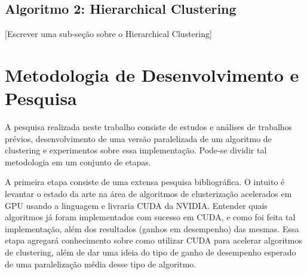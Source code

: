 \documentclass[12pt, %
openright, 
oneside, %
a4paper,    %
brazil]{facom-ufu-abntex2}
\begin{document}

\section{Algoritmo 2: Hierarchical Clustering}

[Escrever uma sub-seção sobre o Hierarchical Clustering]












\chapter{Metodologia de Desenvolvimento e Pesquisa}


A pesquisa realizada neste trabalho consiste de estudos e análises de trabalhos prévios, desenvolvimento de uma versão paralelizada de um algoritmo de clustering e experimentos sobre essa implementação. Pode-se dividir tal metodologia em um conjunto de etapas.

A primeira etapa consiste de uma extensa pesquisa bibliográfica. O intuito é levantar o estado da arte na área de algoritmos de clusterização acelerados em GPU usando a linguagem e livraria CUDA da NVIDIA. Entender quais algoritmos já foram implementados com sucesso em CUDA, e como foi feita tal implementação, além dos resultados (ganhos em desempenho) das mesmas. Essa etapa agregará conhecimento sobre como utilizar CUDA para acelerar algoritmos de clustering, além de dar uma ideia do tipo de ganho de desempenho esperado de uma paralelização média desse tipo de algoritmo.
\end{document}
